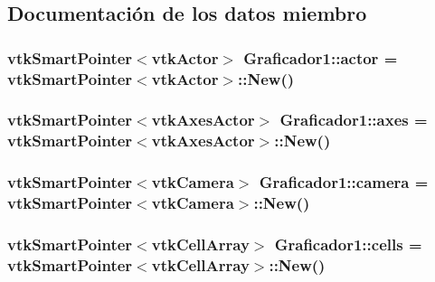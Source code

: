 \subsection{Documentación de los datos miembro}
\subsubsection[{\texorpdfstring{actor}{actor}}]{\setlength{\rightskip}{0pt plus 5cm}vtk\+Smart\+Pointer$<$vtk\+Actor$>$ Graficador1\+::actor = vtk\+Smart\+Pointer$<$vtk\+Actor$>$\+::New()}\hypertarget{class_graficador1_a8ae74354def8d4b9cf9a5888a3d5f7f6}{}\label{class_graficador1_a8ae74354def8d4b9cf9a5888a3d5f7f6}
\subsubsection[{\texorpdfstring{axes}{axes}}]{\setlength{\rightskip}{0pt plus 5cm}vtk\+Smart\+Pointer$<$vtk\+Axes\+Actor$>$ Graficador1\+::axes = vtk\+Smart\+Pointer$<$vtk\+Axes\+Actor$>$\+::New()}\hypertarget{class_graficador1_a2e21aceca117ab118ac832fab7069222}{}\label{class_graficador1_a2e21aceca117ab118ac832fab7069222}
\subsubsection[{\texorpdfstring{camera}{camera}}]{\setlength{\rightskip}{0pt plus 5cm}vtk\+Smart\+Pointer$<$vtk\+Camera$>$ Graficador1\+::camera = vtk\+Smart\+Pointer$<$vtk\+Camera$>$\+::New()}\hypertarget{class_graficador1_a84c019e93c84cebb467b96fe51f7e00f}{}\label{class_graficador1_a84c019e93c84cebb467b96fe51f7e00f}
\subsubsection[{\texorpdfstring{cells}{cells}}]{\setlength{\rightskip}{0pt plus 5cm}vtk\+Smart\+Pointer$<$vtk\+Cell\+Array$>$ Graficador1\+::cells = vtk\+Smart\+Pointer$<$vtk\+Cell\+Array$>$\+::New()}\hypertarget{class_graficador1_a0cfb1ed1aa24256300eba63ec3961be8}{}\label{class_graficador1_a0cfb1ed1aa24256300eba63ec3961be8}
